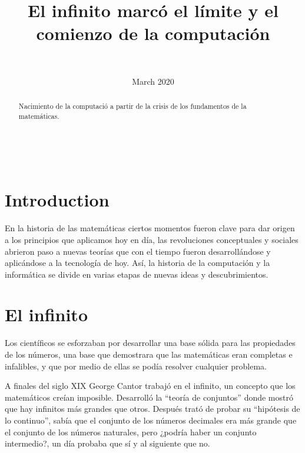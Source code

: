 ﻿\documentclass[journal,10pt,spanish]{IEEEtran}
\begin{document}
    \title{El infinito marcó el límite y el comienzo de la computación}\\
    \author{\\
}
\maketitle
\date{March 2020}

\maketitle
\begin{abstract}
    Nacimiento de la computació a partir de la crisis de los fundamentos de la matemáticas. \cite{sitio}
\end{abstract}


\section{Introduction}

En la historia de las matemáticas ciertos momentos fueron clave para dar origen a los principios que aplicamos hoy en día, las revoluciones conceptuales y sociales abrieron paso a nuevas teorías que con el tiempo fueron desarrollándose y aplicándose a la tecnología de hoy. Así, la historia de la computación y la informática se divide en varias etapas de nuevas ideas y descubrimientos.  

\section {El infinito}

Los científicos se esforzaban por desarrollar una base sólida para las propiedades de los números, una base que demostrara que las matemáticas eran completas e infalibles, y que por medio de ellas se podía resolver cualquier problema. 

A finales del siglo XIX George Cantor trabajó en el infinito, un concepto que los matemáticos creían imposible. Desarrolló la “teoría de conjuntos” donde mostró que hay infinitos más grandes que otros. Después trató de probar su “hipótesis de lo continuo”, sabía que el conjunto de los números decimales era más grande que el conjunto de los números naturales, pero ¿podría haber un conjunto intermedio?, un día probaba que sí y al siguiente que no. \cite{sitio2} \cite{sitio3} 
\end{document}
